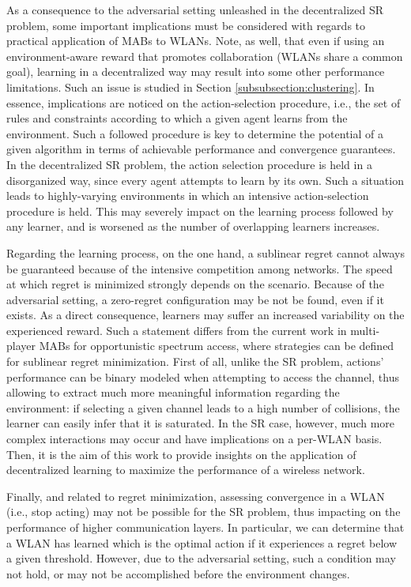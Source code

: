 \documentclass{article}
\begin{document}
As a consequence to the adversarial setting unleashed in the decentralized SR problem, some important implications must be considered with regards to practical application of MABs to WLANs. Note, as well, that even if using an environment-aware reward that promotes collaboration (WLANs share a common goal), learning in a decentralized way may result into some other performance limitations. Such an issue is studied in Section \ref{subsubsection:clustering}. In essence, implications are noticed on the action-selection procedure, i.e., the set of rules and constraints according to which a given agent learns from the environment. Such a followed procedure is key to determine the potential of a given algorithm in terms of achievable performance and convergence guarantees. In the decentralized SR problem, the action selection procedure is held in a disorganized way, since every agent attempts to learn by its own. Such a situation leads to highly-varying environments in which an intensive action-selection procedure is held. This may severely impact on the learning process followed by any learner, and is worsened as the number of overlapping learners increases.

Regarding the learning process, on the one hand, a sublinear regret cannot always be guaranteed because of the intensive competition among networks. The speed at which regret is minimized strongly depends on the scenario. Because of the adversarial setting, a zero-regret configuration may be not be found, even if it exists. As a direct consequence, learners may suffer an increased variability on the experienced reward. Such a statement differs from the current work in multi-player MABs for opportunistic spectrum access, where strategies can be defined for sublinear regret minimization. First of all, unlike the SR problem, actions' performance can be binary modeled when attempting to access the channel, thus allowing to extract much more meaningful information regarding the environment: if selecting a given channel leads to a high number of collisions, the learner can easily infer that it is saturated. In the SR case, however, much more complex interactions may occur and have implications on a per-WLAN basis. Then, it is the aim of this work to provide insights on the application of decentralized learning to maximize the performance of a wireless network.

Finally, and related to regret minimization, assessing convergence in a WLAN (i.e., stop acting) may not be possible for the SR problem, thus impacting on the performance of higher communication layers. In particular, we can determine that a WLAN has learned which is the optimal action if it experiences a regret below a given threshold. However, due to the adversarial setting, such a condition may not hold, or may not be accomplished before the environment changes. 
\end{document}
